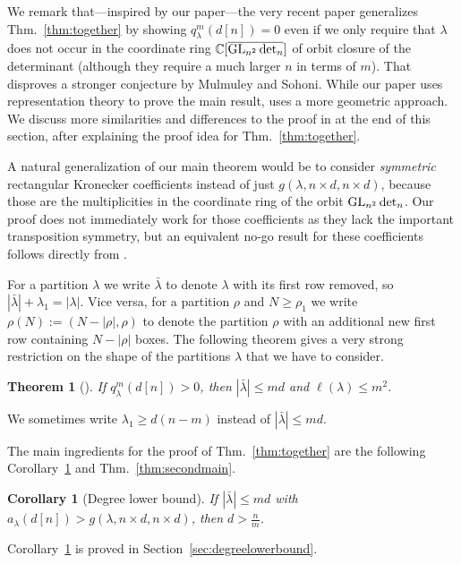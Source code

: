 \documentclass{article}
\numberwithin{equation}{section}
\newtheorem{theorem}[equation]{Theorem}
\newtheorem{corollary}[equation]{Corollary}
\theoremstyle{definition}
\def\la{\lambda}
\newcommand{\IC}{\mathbb C}
\DeclareMathOperator{\GL}{GL}
\renewcommand{\det}{\textup{det}}
\begin{document}
We remark that---inspired by our paper---the very recent paper \cite{BIP:16} generalizes Thm.~\ref{thm:together} by
showing $q^m_\la(d[n])=0$ even if we only require that $\la$ does not occur in the
coordinate ring $\IC[\overline{\GL_{n^2}\det_n}]$ of orbit closure of the determinant (although they require a much larger $n$ in terms of $m$).
That disproves a stronger conjecture by Mulmuley and Sohoni.
While our paper uses representation theory to prove the main result, \cite{BIP:16} uses a more geometric approach.
We discuss more similarities and differences to the proof in \cite{BIP:16} at the end of this section, after
explaining the proof idea for Thm.~\ref{thm:together}.

A natural generalization of our main theorem would be to consider \emph{symmetric} rectangular Kronecker coefficients
instead of just $g(\la,n \times d, n\times d)$, because those are the multiplicities in the coordinate ring of the orbit $\GL_{n^2}\det_n$.
Our proof does not immediately work for those coefficients as they lack the important transposition symmetry,
but an equivalent no-go result for these coefficients follows directly from \cite{BIP:16}.

For a partition $\lambda$ we write $\bar\lambda$ to denote $\lambda$ with its first row removed, so $|\bar\lambda|+\la_1=|\la|$.
Vice versa, for a partition $\rho$ and $N \geq \rho_1$ we write $\rho(N) := (N - |\rho|,\rho)$ to denote the partition $\rho$ with an additional new first row
containing $N-|\rho|$ boxes.
The following theorem gives a very strong restriction on the shape of the partitions $\la$ that we have to consider.
\begin{theorem}[{\cite{LK:12}}]\label{thm:kadishlandsberg}
If $q^m_\la(d[n]) > 0$, then $|\bar\lambda|\leq md$ and $\ell(\la)\leq m^2$.
\end{theorem}
We sometimes write $\la_1 \geq d(n-m)$ instead of $|\bar\lambda|\leq md$.

The main ingredients for the proof of Thm.~\ref{thm:together} are the following Corollary~\ref{cor:degreelowerbound} and Thm.~\ref{thm:secondmain}.
\begin{corollary}[Degree lower bound]\label{cor:degreelowerbound}
If $|\bar\la|\leq md$ with $a_\la(d[n]) > g(\la,n \times d, n\times d)$, then $d>\frac n m$.
\end{corollary}
Corollary~\ref{cor:degreelowerbound} is proved in Section~\ref{sec:degreelowerbound}.
\end{document}
